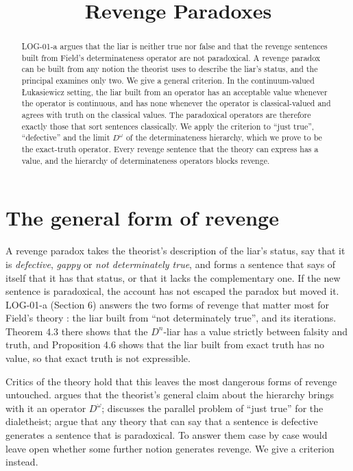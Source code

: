 \documentclass{situationist-preprint}
\title{Revenge Paradoxes}
\begin{document}
\maketitle

\begin{abstract}
LOG-01-a argues that the liar is neither true nor false and that the revenge sentences built from Field's determinateness operator are not paradoxical. A revenge paradox can be built from any notion the theorist uses to describe the liar's status, and the principal examines only two. We give a general criterion. In the continuum-valued Łukasiewicz setting, the liar built from an operator has an acceptable value whenever the operator is continuous, and has none whenever the operator is classical-valued and agrees with truth on the classical values. The paradoxical operators are therefore exactly those that sort sentences classically. We apply the criterion to \enquote{just true}, \enquote{defective} and the limit $D^\omega$ of the determinateness hierarchy, which we prove to be the exact-truth operator. Every revenge sentence that the theory can express has a value, and the hierarchy of determinateness operators blocks revenge.
\end{abstract}

\section{The general form of revenge}

A revenge paradox takes the theorist's description of the liar's status, say that it is \emph{defective}, \emph{gappy} or \emph{not determinately true}, and forms a sentence that says of itself that it has that status, or that it lacks the complementary one. If the new sentence is paradoxical, the account has not escaped the paradox but moved it. LOG-01-a (Section 6) answers the two forms of revenge that matter most for Field's theory \citep{Field2003,Field2008}: the liar built from \enquote{not determinately true}, and its iterations. Theorem 4.3 there shows that the $D^n$-liar has a value strictly between falsity and truth, and Proposition 4.6 shows that the liar built from exact truth has no value, so that exact truth is not expressible.

Critics of the theory hold that this leaves the most dangerous forms of revenge untouched. \citet{Priest2010} argues that the theorist's general claim about the hierarchy brings with it an operator $D^\omega$; \citet{Beall2009} discusses the parallel problem of \enquote{just true} for the dialetheist; \citet{MurziRossi2020} argue that any theory that can say that a sentence is defective generates a sentence that is paradoxical. To answer them case by case would leave open whether some further notion generates revenge. We give a criterion instead.
\end{document}
